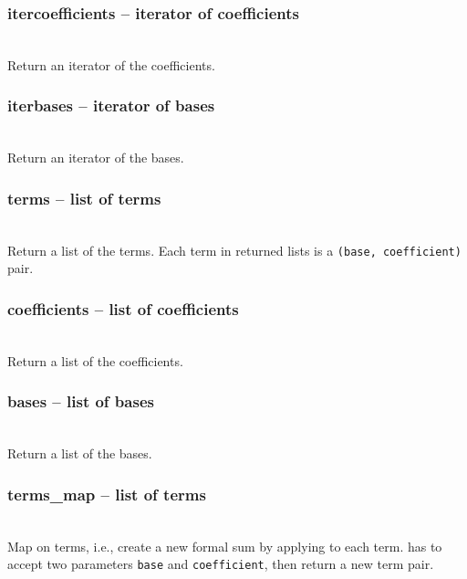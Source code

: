  \subsubsection{itercoefficients -- iterator of coefficients}
   \\
   \spacing
   \quad Return an iterator of the coefficients.\\
 \subsubsection{iterbases -- iterator of bases}
   \\
   \spacing
   \quad Return an iterator of the bases.\\
  \subsubsection{terms -- list of terms}
   \\
   \spacing
   \quad Return a list of the terms.
   \spacing
   \quad Each term in returned lists is a {\tt (base, coefficient)} pair.\\
 \subsubsection{coefficients -- list of coefficients}
   \\
   \spacing
   \quad Return a list of the coefficients.\\
 \subsubsection{bases -- list of bases}
   \\
   \spacing
   \quad Return a list of the bases.\\
  \subsubsection{terms\_map -- list of terms}
   \\
   \spacing
   \quad Map on terms, i.e., create a new formal sum by applying 
   to each term.
   \spacing
   \quad {} has to accept two parameters {\tt base} and
   {\tt coefficient}, then return a new term pair.
